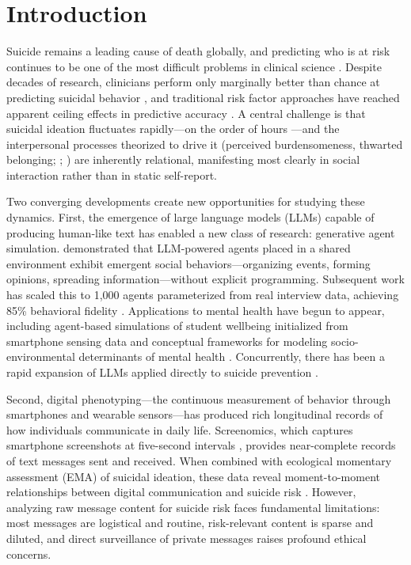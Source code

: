 \documentclass[review,12pt,authoryear]{elsarticle}
\begin{document}
\linenumbers

\section{Introduction}

Suicide remains a leading cause of death globally, and predicting who is at risk continues to be one of the most difficult problems in clinical science \citep{franklin2017risk}. Despite decades of research, clinicians perform only marginally better than chance at predicting suicidal behavior \citep{large2017meta}, and traditional risk factor approaches have reached apparent ceiling effects in predictive accuracy \citep{belsher2019prediction}. A central challenge is that suicidal ideation fluctuates rapidly---on the order of hours \citep{kleiman2017examination}---and the interpersonal processes theorized to drive it (perceived burdensomeness, thwarted belonging; \citealt{joiner2005why}; \citealt{vanorden2010interpersonal}) are inherently relational, manifesting most clearly in social interaction rather than in static self-report.

Two converging developments create new opportunities for studying these dynamics. First, the emergence of large language models (LLMs) capable of producing human-like text has enabled a new class of research: generative agent simulation. \citet{park2023generative} demonstrated that LLM-powered agents placed in a shared environment exhibit emergent social behaviors---organizing events, forming opinions, spreading information---without explicit programming. Subsequent work has scaled this to 1,000 agents parameterized from real interview data, achieving 85\% behavioral fidelity \citep{park2024generative}. Applications to mental health have begun to appear, including agent-based simulations of student wellbeing initialized from smartphone sensing data \citep{zhao2025studentlife} and conceptual frameworks for modeling socio-environmental determinants of mental health \citep{kambeitz2025modelling}. Concurrently, there has been a rapid expansion of LLMs applied directly to suicide prevention \citep{holmes2025scoping}.

Second, digital phenotyping---the continuous measurement of behavior through smartphones and wearable sensors---has produced rich longitudinal records of how individuals communicate in daily life. Screenomics, which captures smartphone screenshots at five-second intervals \citep{reeves2021screenomics}, provides near-complete records of text messages sent and received. When combined with ecological momentary assessment (EMA) of suicidal ideation, these data reveal moment-to-moment relationships between digital communication and suicide risk \citep{ammerman2026beyond}. However, analyzing raw message content for suicide risk faces fundamental limitations: most messages are logistical and routine, risk-relevant content is sparse and diluted, and direct surveillance of private messages raises profound ethical concerns.
\end{document}

